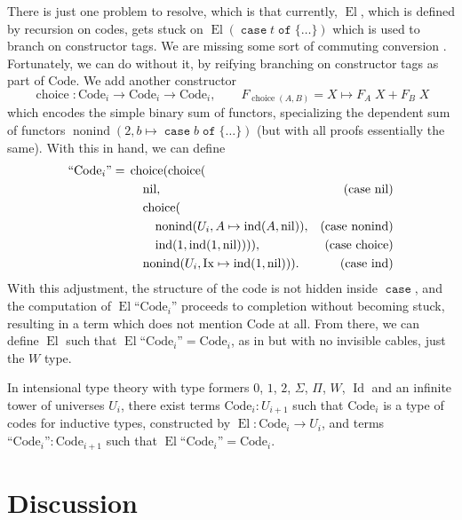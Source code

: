 \documentclass[a4paper,UKenglish,cleveref,nameinlink,autoref,thm-restate]{lipics-v2019}
\newcommand{\zero}{0}
\newcommand{\one}{1}
\newcommand{\bool}{2}
\DeclareMathOperator{\case}{\mathtt{case}}
\newcommand{\caset}[2]{\case {#1}\;\mathtt{of}\;\{{#2}\}}
\DeclareMathOperator{\Idop}{\mathrm{Id}}
\DeclareMathOperator{\nonind}{nonind}
\DeclareMathOperator{\ind}{ind}
\DeclareMathOperator{\nil}{nil}
\DeclareMathOperator{\choice}{choice}
\newcommand{\Code}{\mathrm{Code}}
\newcommand{\Ix}{\mathrm{Ix}}
\DeclareMathOperator{\El}{El}
\newcommand{\mathquote}[1]{\text{``${#1}$''}}
\begin{document}
There is just one problem to resolve, which is that currently, $\El$, which is defined by recursion on codes, gets stuck on $\El (\caset{t}{\dots})$ which is used to branch on constructor tags. We are missing some sort of commuting conversion \cite[section 10]{girard-proofs-and-types}. Fortunately, we can do without it, by reifying branching on constructor tags as part of $\Code$. We add another constructor
\begin{equation}
\choice : \Code_i \to \Code_i \to \Code_i,\qquad F_{\choice(A,B)} = X \mapsto F_A\;X + F_B\;X
\end{equation}
which encodes the simple binary sum of functors, specializing the dependent sum of functors $\nonind(2,b\mapsto\caset{b}{\dots})$ (but with all proofs essentially the same). With this in hand, we can define
\begin{align}
\mathquote{\Code_i} ={}& \choice(\choice(\\
&\quad\nil,&\text{(case $\nil$)}\notag\\
&\quad\choice(\notag\\
&\qquad\nonind(U_i,A\mapsto \ind(A,\nil)),&\text{(case $\nonind$)}\notag\\
&\qquad\ind(1,\ind(1,\nil)))),&\text{(case $\choice$)}\notag\\
&\quad\nonind(U_i,\Ix \mapsto \ind(1,\nil))).&\text{(case $\ind$)}\notag
\end{align}
With this adjustment, the structure of the code is not hidden inside $\case$, and the computation of $\El\mathquote{\Code_i}$ proceeds to completion without becoming stuck, resulting in a term which does not mention $\Code$ at all. From there, we can define $\El$ such that $\El\mathquote{\Code_i} = \Code_i$, as in \cite{levitation} but with no invisible cables, just the $W$ type.
\begin{theorem}
    In intensional type theory with type formers $\zero$, $\one$, $\bool$, $\Sigma$, $\Pi$, $W$, $\Idop$ and an infinite tower of universes $U_i$, there exist terms $\Code_i : U_{i+1}$ such that $\Code_i$ is a type of codes for inductive types, constructed by $\El : \Code_i \to U_i$, and terms $\mathquote{\Code_i} : \Code_{i+1}$ such that $\El\mathquote{\Code_i} = \Code_i$.
\end{theorem}

\section{Discussion}
\end{document}
